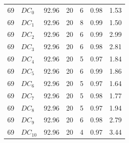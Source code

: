 \begin{longtable}{rlrrrrr}
69 & $DC_{0}$ & 92.96 & 20 & 6 & 0.98 & 1.53 \\
69 & $DC_{1}$ & 92.96 & 20 & 8 & 0.99 & 1.50 \\
69 & $DC_{2}$ & 92.96 & 20 & 6 & 0.99 & 2.99 \\
69 & $DC_{3}$ & 92.96 & 20 & 6 & 0.98 & 2.81 \\
69 & $DC_{4}$ & 92.96 & 20 & 5 & 0.97 & 1.84 \\
69 & $DC_{5}$ & 92.96 & 20 & 6 & 0.99 & 1.86 \\
69 & $DC_{6}$ & 92.96 & 20 & 5 & 0.97 & 1.64 \\
69 & $DC_{7}$ & 92.96 & 20 & 5 & 0.98 & 1.77 \\
69 & $DC_{8}$ & 92.96 & 20 & 5 & 0.97 & 1.94 \\
69 & $DC_{9}$ & 92.96 & 20 & 6 & 0.98 & 2.79 \\
69 & $DC_{10}$ & 92.96 & 20 & 4 & 0.97 & 3.44 \\
\end{longtable}
